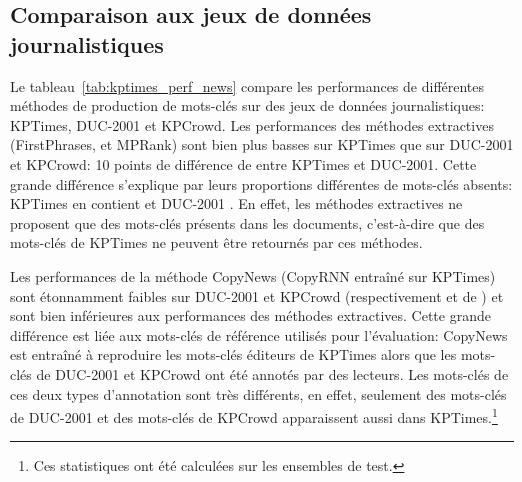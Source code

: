 \subsection{Comparaison aux jeux de données journalistiques}


Le tableau~\ref{tab:kptimes_perf_news} compare les performances de différentes méthodes de production de mots-clés sur des jeux de données journalistiques: KPTimes, DUC-2001 et KPCrowd.
Les performances des méthodes extractives (FirstPhrases, \tfidf{} et MPRank) sont bien plus basses sur KPTimes que sur DUC-2001 et KPCrowd: 10 points de différence de \map{} entre KPTimes et DUC-2001. Cette grande différence s'explique par leurs proportions différentes de mots-clés absents: KPTimes en contient  et DUC-2001 .
En effet, les méthodes extractives ne proposent que des mots-clés présents dans les documents, c'est-à-dire que  des mots-clés de KPTimes ne peuvent être retournés par ces méthodes.

Les performances de la méthode CopyNews (CopyRNN entraîné sur KPTimes) sont étonnamment faibles sur DUC-2001 et KPCrowd (respectivement  et  de \map{}) et sont bien inférieures aux performances des méthodes extractives.
Cette grande différence est liée aux mots-clés de référence utilisés pour l'évaluation: CopyNews est entraîné à reproduire les mots-clés éditeurs de KPTimes alors que les mots-clés de DUC-2001 et KPCrowd ont été annotés par des lecteurs. Les mots-clés de ces deux types d'annotation sont très différents, en effet, seulement  des mots-clés de DUC-2001 et  des mots-clés de KPCrowd apparaissent aussi dans KPTimes.\footnote{Ces statistiques ont été calculées sur les ensembles de test.}




